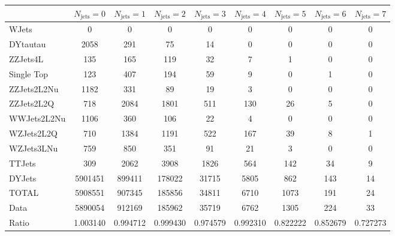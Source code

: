 \footnotesize{
\begin{tabular}{l|cccccccc} 
  &  $N_{\text{jets}} = 0 $ & $N_{\text{jets}} = 1 $ & $N_{\text{jets}} = 2 $ & $N_{\text{jets}} = 3 $ & $N_{\text{jets}} = 4 $ & $N_{\text{jets}} = 5 $ & $N_{\text{jets}} = 6 $ & $N_{\text{jets}} = 7$ \\ \hline 
   WJets        & 0 & 0 & 0 & 0 & 0 & 0 & 0 & 0 \\ 
   DYtautau        & 2058 & 291 & 75 & 14 & 0 & 0 & 0 & 0 \\ 
   ZZJets4L        & 135 & 165 & 119 & 32 & 7 & 1 & 0 & 0 \\ 
   Single Top        & 123 & 407 & 194 & 59 & 9 & 0 & 1 & 0 \\ 
   ZZJets2L2Nu        & 1182 & 331 & 89 & 19 & 3 & 0 & 0 & 0 \\ 
   ZZJets2L2Q        & 718 & 2084 & 1801 & 511 & 130 & 26 & 5 & 0 \\ 
   WWJets2L2Nu        & 1106 & 360 & 106 & 22 & 4 & 0 & 0 & 0 \\ 
   WZJets2L2Q        & 710 & 1384 & 1191 & 522 & 167 & 39 & 8 & 1 \\ 
   WZJets3LNu        & 759 & 850 & 351 & 91 & 21 & 3 & 0 & 0 \\ 
   TTJets        & 309 & 2062 & 3908 & 1826 & 564 & 142 & 34 & 9 \\ 
   DYJets        & 5901451 & 899411 & 178022 & 31715 & 5805 & 862 & 143 & 14 \\ 
 \hline 
 TOTAL & 5908551 & 907345 & 185856 & 34811 & 6710 & 1073 & 191 & 24 \\ 
 \hline 
 Data          & 5890054 & 912169 & 185962 & 35719 & 6762 & 1305 & 224 & 33 \\ 
  Ratio          & 1.003140 & 0.994712 & 0.999430 & 0.974579 & 0.992310 & 0.822222 & 0.852679 & 0.727273 \\ 
 \end{tabular}}